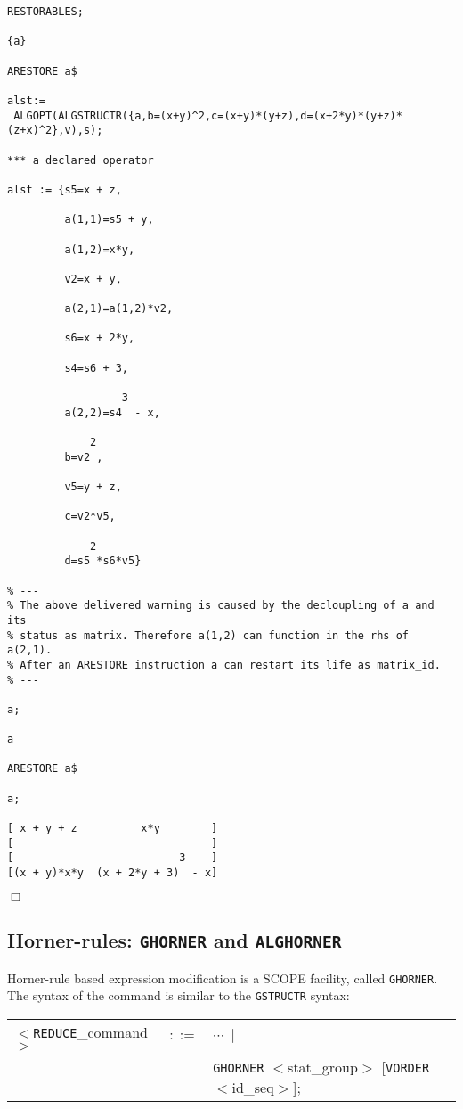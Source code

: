 {\small
\begin{verbatim}
RESTORABLES;

{a}

ARESTORE a$

alst:=
 ALGOPT(ALGSTRUCTR({a,b=(x+y)^2,c=(x+y)*(y+z),d=(x+2*y)*(y+z)*(z+x)^2},v),s);

*** a declared operator

alst := {s5=x + z,

         a(1,1)=s5 + y,

         a(1,2)=x*y,

         v2=x + y,

         a(2,1)=a(1,2)*v2,

         s6=x + 2*y,

         s4=s6 + 3,

                  3
         a(2,2)=s4  - x,

             2
         b=v2 ,

         v5=y + z,

         c=v2*v5,

             2
         d=s5 *s6*v5}

% ---
% The above delivered warning is caused by the decloupling of a and its
% status as matrix. Therefore a(1,2) can function in the rhs of a(2,1).
% After an ARESTORE instruction a can restart its life as matrix_id.
% ---

a;

a

ARESTORE a$

a;

[ x + y + z          x*y        ]
[                               ]
[                          3    ]
[(x + y)*x*y  (x + 2*y + 3)  - x]
\end{verbatim}
\begin{flushright}
$\Box$
\end{flushright}}

\subsection{Horner-rules: {\tt GHORNER} and {\tt ALGHORNER}} \label{SSF:Hr}

Horner-rule based expression modification is a SCOPE facility,
called {\tt GHORNER}. The syntax of the command is similar to the
{\tt GSTRUCTR} syntax:

\begin{center}
\begin{tabular}{lcl}
$<${\tt REDUCE}\_command$>$ & $::=$ & $\cdots~\mid$\\
& & {\tt GHORNER} $<$stat\_group$>$ [{\tt VORDER} $<$id\_seq$>$];
\end{tabular}
\end{center}

